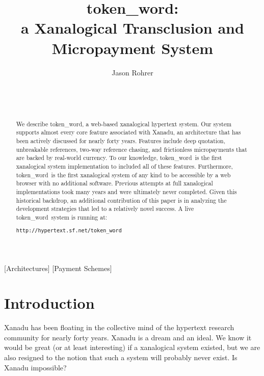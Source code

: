 \documentclass{acm_proc_article-sp}
\newcommand{\tokenWord}{token\_word}
\begin{document}
\title{\tokenWord:\\a Xanalogical Transclusion and Micropayment System}



\author{
\alignauthor Jason Rohrer\\
    \\
    \\
    \\
}

\maketitle



\begin{abstract}
We describe \tokenWord, a web-based xanalogical hypertext system.  
Our system supports almost every core feature associated with Xanadu, an architecture that has been actively discussed for nearly forty years.
Features include deep quotation, unbreakable references, two-way reference chasing, and frictionless micropayments that are backed by real-world currency.
To our knowledge, \tokenWord \  is the first xanalogical system implementation to included all of these features.  Furthermore, \tokenWord \  is the first xanalogical system of any kind to be accessible by a web browser with no additional software.
Previous attempts at full xanalogical implementations took many years and were ultimately never completed.
Given this historical backdrop, an additional contribution of this paper is in analyzing the development strategies that led to a relatively novel success.
A live \tokenWord \  system is running at:

\centering\texttt{http://hypertext.sf.net/token\_word}

\end{abstract}

[Architectures]
[Payment Schemes]




\section{Introduction}
\label{sec:Introduction}
Xanadu has been floating in the collective mind of the hypertext research community for nearly forty years.
Xanadu is a dream and an ideal.  
We know it would be great (or at least interesting) if a xanalogical system existed, but we are also resigned to the notion that such a system will probably never exist.
Is Xanadu impossible?
\end{document}
